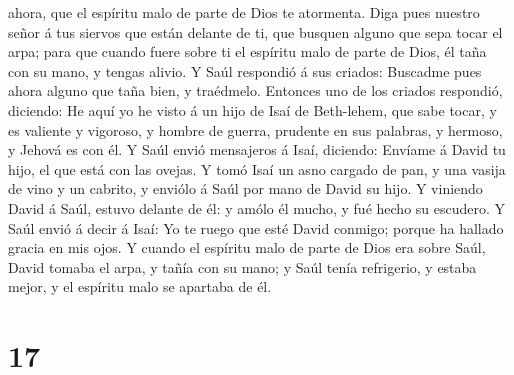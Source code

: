 ahora, que el espíritu malo de parte de Dios te atormenta.
 Diga pues nuestro señor á tus siervos que están delante
de ti, que busquen alguno que sepa tocar el arpa; para que cuando fuere
sobre ti el espíritu malo de parte de Dios, él taña con su mano, y
tengas alivio.  Y Saúl respondió á sus criados: Buscadme
pues ahora alguno que taña bien, y traédmelo.  Entonces
uno de los criados respondió, diciendo: He aquí yo he visto á un hijo de
Isaí de Beth-lehem, que sabe tocar, y es valiente y vigoroso, y hombre
de guerra, prudente en sus palabras, y hermoso, y Jehová es con él.
 Y Saúl envió mensajeros á Isaí, diciendo: Envíame á
David tu hijo, el que está con las ovejas.  Y tomó Isaí
un asno cargado de pan, y una vasija de vino y un cabrito, y enviólo á
Saúl por mano de David su hijo.  Y viniendo David á Saúl,
estuvo delante de él: y amólo él mucho, y fué hecho su escudero.
 Y Saúl envió á decir á Isaí: Yo te ruego que esté David
conmigo; porque ha hallado gracia en mis ojos.  Y cuando
el espíritu malo de parte de Dios era sobre Saúl, David tomaba el arpa,
y tañía con su mano; y Saúl tenía refrigerio, y estaba mejor, y el
espíritu malo se apartaba de él.

\hypertarget{section-16}{%
\section{17}\label{section-16}}

